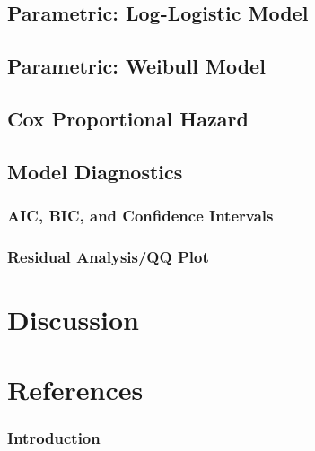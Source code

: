 \documentclass[
]{article}
\begin{document}
\hypertarget{parametric-log-logistic-model}{%
\subsection{Parametric: Log-Logistic
Model}\label{parametric-log-logistic-model}}

\hypertarget{parametric-weibull-model}{%
\subsection{Parametric: Weibull Model}\label{parametric-weibull-model}}

\hypertarget{cox-proportional-hazard}{%
\subsection{Cox Proportional Hazard}\label{cox-proportional-hazard}}

\hypertarget{model-diagnostics}{%
\subsection{Model Diagnostics}\label{model-diagnostics}}

\hypertarget{aic-bic-and-confidence-intervals}{%
\subsubsection{AIC, BIC, and Confidence
Intervals}\label{aic-bic-and-confidence-intervals}}

\hypertarget{residual-analysisqq-plot}{%
\subsubsection{Residual Analysis/QQ
Plot}\label{residual-analysisqq-plot}}

\hypertarget{discussion}{%
\section{Discussion}\label{discussion}}

\hypertarget{references}{%
\section{References}\label{references}}

\hypertarget{introduction-1}{%
\subsubsection{Introduction}\label{introduction-1}}
\end{document}
